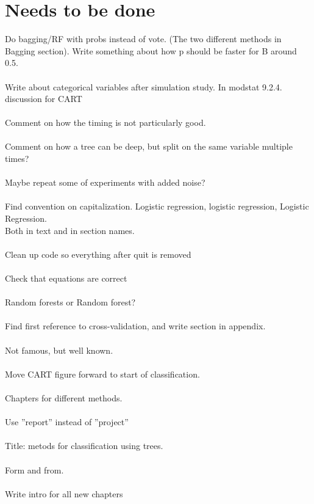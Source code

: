 \section{Needs to be done}
\label{sec:Needs to be done}
Do bagging/RF with probs instead of vote. (The two different methods in Bagging section). Write something about how p should be faster for B around 0.5.\\
\\
Write about categorical variables after simulation study. In modstat 9.2.4. discussion for CART\\
\\
Comment on how the timing is not particularly good. \\
\\
Comment on how a tree can be deep, but split on the same variable multiple times?\\
\\
Maybe repeat some of experiments with added noise?\\
\\
Find convention on capitalization. Logistic regression, logistic regression, Logistic Regression. \\
Both in text and in section names.\\
\\
Clean up code so everything after quit is removed\\
\\
Check that equations are correct\\
\\
Random forests or Random forest? \\
\\
Find first reference to cross-validation, and write section in appendix.\\
\\
Not famous, but well known.\\
\\
Move CART figure forward to start of classification. \\
\\
Chapters for different methods. \\
\\
Use ''report'' instead of ''project''\\
\\
Title: metods for classification using trees.\\
\\
Form and from. \\
\\
Write intro for all new chapters\\
